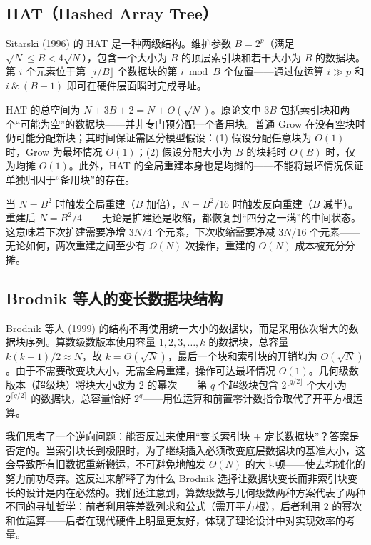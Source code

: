 \documentclass[12pt,a4paper]{ctexart}
\begin{document}
\subsection{HAT（Hashed Array Tree）}

Sitarski (1996) 的 HAT 是一种两级结构。维护参数 $B = 2^p$（满足 $\sqrt{N} \le B < 4\sqrt{N}$），包含一个大小为 $B$ 的顶层索引块和若干大小为 $B$ 的数据块。第 $i$ 个元素位于第 $\lfloor i/B \rfloor$ 个数据块的第 $i \bmod B$ 个位置——通过位运算 $i \gg p$ 和 $i\ \&\ (B-1)$ 即可在硬件层面瞬时完成寻址。

HAT 的总空间为 $N + 3B + 2 = N + O(\sqrt{N})$。原论文中 $3B$ 包括索引块和两个``可能为空''的数据块——并非专门预分配一个备用块。普通 Grow 在没有空块时仍可能分配新块；其时间保证需区分模型假设：(1) 假设分配任意块为 $O(1)$ 时，Grow 为最坏情况 $O(1)$；(2) 假设分配大小为 $B$ 的块耗时 $O(B)$ 时，仅为均摊 $O(1)$。此外，HAT 的全局重建本身也是均摊的——不能将最坏情况保证单独归因于``备用块''的存在。

当 $N = B^2$ 时触发全局重建（$B$ 加倍），$N = B^2/16$ 时触发反向重建（$B$ 减半）。重建后 $N = B^2/4$——无论是扩建还是收缩，都恢复到``四分之一满''的中间状态。这意味着下次扩建需要净增 $3N/4$ 个元素，下次收缩需要净减 $3N/16$ 个元素——无论如何，两次重建之间至少有 $\Omega(N)$ 次操作，重建的 $O(N)$ 成本被充分分摊。

\subsection{Brodnik 等人的变长数据块结构}

Brodnik 等人 (1999) 的结构不再使用统一大小的数据块，而是采用依次增大的数据块序列。算数级数版本使用容量 $1, 2, 3, \ldots, k$ 的数据块，总容量 $k(k+1)/2 \approx N$，故 $k = \Theta(\sqrt{N})$，最后一个块和索引块的开销均为 $O(\sqrt{N})$。由于不需要改变块大小，无需全局重建，操作可达最坏情况 $O(1)$。几何级数版本（超级块）将块大小改为 $2$ 的幂次——第 $q$ 个超级块包含 $2^{\lfloor q/2 \rfloor}$ 个大小为 $2^{\lceil q/2 \rceil}$ 的数据块，总容量恰好 $2^q$——用位运算和前置零计数指令取代了开平方根运算。

我们思考了一个逆向问题：能否反过来使用``变长索引块 $+$ 定长数据块''？答案是否定的。当索引块长到极限时，为了继续插入必须改变底层数据块的基准大小，这会导致所有旧数据重新搬运，不可避免地触发 $\Theta(N)$ 的大卡顿——使去均摊化的努力前功尽弃。这反过来解释了为什么 Brodnik 选择让数据块变长而非索引块变长的设计是内在必然的。我们还注意到，算数级数与几何级数两种方案代表了两种不同的寻址哲学：前者利用等差数列求和公式（需开平方根），后者利用 $2$ 的幂次和位运算——后者在现代硬件上明显更友好，体现了理论设计中对实现效率的考量。
\end{document}
